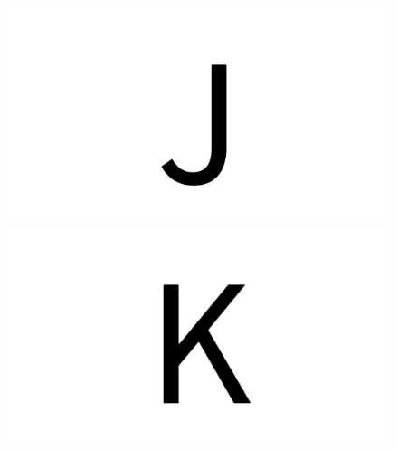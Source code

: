 \documentclass{article}
\begin{document}
\begin{figure}[H]
  \includegraphics[width=\linewidth]{u_J}
\endminipage\hfill
{}
  \includegraphics[width=\linewidth]{u_K}
\endminipage\hfill
\end{figure}

\clearpage
\end{document}
